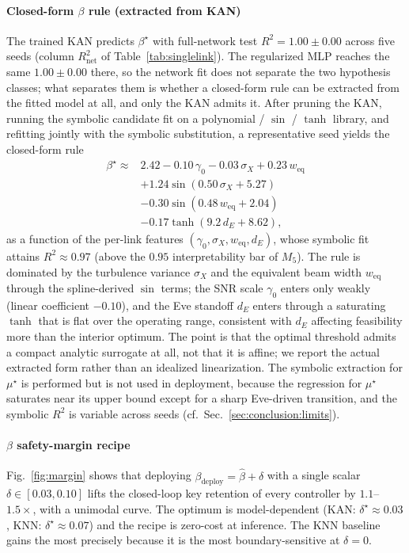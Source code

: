 \paragraph{Closed-form $\beta$ rule (extracted from KAN)}
\label{sec:symbolic}
The trained KAN predicts $\beta^\star$ with full-network test $R^2 = 1.00 \pm 0.00$ across five seeds (column $R^2_{\text{net}}$ of Table~\ref{tab:singlelink}). The regularized MLP reaches the same $1.00 \pm 0.00$ there, so the network fit does not separate the two hypothesis classes; what separates them is whether a closed-form rule can be extracted from the fitted model at all, and only the KAN admits it. After pruning the KAN, running the symbolic candidate fit on a polynomial / $\sin$ / $\tanh$ library, and refitting jointly with the symbolic substitution, a representative seed yields the closed-form rule
\begin{equation}\label{eq:betarule}
\begin{aligned}
  \beta^\star \approx{}& 2.42 - 0.10\,\gamma_0 - 0.03\,\sigma_X + 0.23\,w_{\mathrm{eq}}\\
  &+ 1.24\sin(0.50\,\sigma_X + 5.27)\\
  &- 0.30\sin(0.48\,w_{\mathrm{eq}} + 2.04)\\
  &- 0.17\tanh(9.2\,d_E + 8.62),
\end{aligned}
\end{equation}
as a function of the per-link features $(\gamma_0,\sigma_X,w_{\mathrm{eq}},d_E)$, whose symbolic fit attains $R^2 \approx 0.97$ (above the $0.95$ interpretability bar of $M_5$). The rule is dominated by the turbulence variance $\sigma_X$ and the equivalent beam width $w_{\mathrm{eq}}$ through the spline-derived $\sin$ terms; the SNR scale $\gamma_0$ enters only weakly (linear coefficient $-0.10$), and the Eve standoff $d_E$ enters through a saturating $\tanh$ that is flat over the operating range, consistent with $d_E$ affecting feasibility more than the interior optimum. The point is that the optimal threshold admits a compact analytic surrogate at all, not that it is affine; we report the actual extracted form rather than an idealized linearization. The symbolic extraction for $\mu^\star$ is performed but is not used in deployment, because the regression for $\mu^\star$ saturates near its upper bound except for a sharp Eve-driven transition, and the symbolic $R^2$ is variable across seeds (cf.~Sec.~\ref{sec:conclusion:limits}).

\paragraph{$\beta$ safety-margin recipe}
Fig.~\ref{fig:margin} shows that deploying $\beta_{\mathrm{deploy}} = \hat\beta + \delta$ with a single scalar $\delta \in [0.03, 0.10]$ lifts the closed-loop key retention of every controller by $1.1$--$1.5\times$, with a unimodal curve. The optimum is model-dependent (KAN: $\delta^\star \approx 0.03$, KNN: $\delta^\star \approx 0.07$) and the recipe is zero-cost at inference. The KNN baseline gains the most precisely because it is the most boundary-sensitive at $\delta{=}0$.

